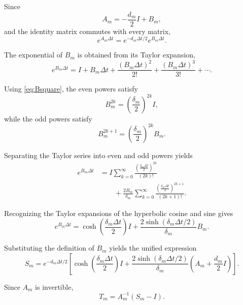 \documentclass{Configuration_Files/PoliMi3i_thesis}
\begin{document}
Since
\begin{equation*}
A_m
=
-\frac{d_m}{2}I+B_m,
\end{equation*}
and the identity matrix commutes with every matrix,
\begin{equation*}
e^{A_m\Delta t}
=
e^{-d_m\Delta t/2}
e^{B_m\Delta t}.
\end{equation*}

The exponential of \(B_m\) is obtained from its Taylor expansion,
\begin{equation*}
e^{B_m\Delta t}
=
I
+
B_m\Delta t
+
\frac{(B_m\Delta t)^2}{2!}
+
\frac{(B_m\Delta t)^3}{3!}
+\cdots.
\end{equation*}

Using \eqref{eq:Bsquare}, the even powers satisfy
\begin{equation*}
B_m^{2k}
=
\left(\frac{\delta_m}{2}\right)^{2k}I,
\end{equation*}
while the odd powers satisfy
\begin{equation*}
B_m^{2k+1}
=
\left(\frac{\delta_m}{2}\right)^{2k}B_m.
\end{equation*}

Separating the Taylor series into even and odd powers yields
\begin{align*}
e^{B_m\Delta t}
&=
I
\sum_{k=0}^{\infty}
\frac{\left(\frac{\delta_m\Delta t}{2}\right)^{2k}}
{(2k)!}
\nonumber\\
&\qquad
+
\frac{2B_m}{\delta_m}
\sum_{k=0}^{\infty}
\frac{\left(\frac{\delta_m\Delta t}{2}\right)^{2k+1}}
{(2k+1)!}.
\end{align*}

Recognizing the Taylor expansions of the hyperbolic cosine and sine gives
\begin{equation*}
e^{B_m\Delta t}
=
\cosh\!\left(
\frac{\delta_m\Delta t}{2}
\right)
I
+
\frac{2\sinh(\delta_m\Delta t/2)}
{\delta_m}
B_m.
\end{equation*}

Substituting the definition of \(B_m\) yields the unified expression
\begin{equation}
S_m
=
e^{-d_m\Delta t/2}
\left[
\cosh\!\left(
\frac{\delta_m\Delta t}{2}
\right)
I
+
\frac{2\sinh(\delta_m\Delta t/2)}
{\delta_m}
\left(
A_m+\frac{d_m}{2}I
\right)
\right].
\label{eq:SmUnified}
\end{equation}

Since \(A_m\) is invertible,
\begin{equation}
T_m
=
A_m^{-1}(S_m-I).
\label{eq:TmUnified}
\end{equation}
\end{document}
